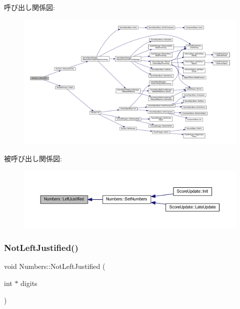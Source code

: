 呼び出し関係図\+:\nopagebreak
\begin{figure}[H]
\begin{center}
\leavevmode
\includegraphics[width=350pt]{class_numbers_af4a06e0dd7dece56d60098837aae5aa5_cgraph}
\end{center}
\end{figure}
被呼び出し関係図\+:\nopagebreak
\begin{figure}[H]
\begin{center}
\leavevmode
\includegraphics[width=350pt]{class_numbers_af4a06e0dd7dece56d60098837aae5aa5_icgraph}
\end{center}
\end{figure}
\mbox{\label{class_numbers_a1aaad1f057da0064766bfd25d57caa17}} 
\subsubsection{\texorpdfstring{Not\+Left\+Justified()}{NotLeftJustified()}}
{\footnotesize\ttfamily void Numbers\+::\+Not\+Left\+Justified (\begin{DoxyParamCaption}\item[{int $\ast$}]{digits }\end{DoxyParamCaption})\hspace{0.3cm}{\ttfamily [private]}}



